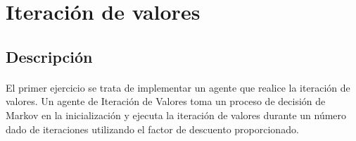 \documentclass{report}
\begin{document}
    \section{Iteración de valores} %
      \subsection*{Descripción}
        \paragraph*{}{
          El primer ejercicio se trata de implementar un agente que realice la iteración de valores. 
          Un agente de Iteración de Valores toma un proceso de decisión de Markov en la inicialización y ejecuta la iteración de valores durante un número dado de iteraciones utilizando el factor de descuento proporcionado.
        }
\end{document}
